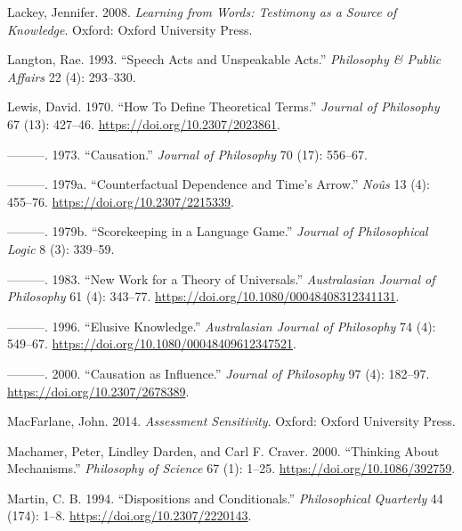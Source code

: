 \documentclass[
  12pt,
  letterpaper,
  DIV=11,
  numbers=noendperiod]{scrartcl}
\newlength{\cslhangindent}
\newenvironment{CSLReferences}[2] %
 {\begin{list}{}{%
  \setlength{\itemindent}{0pt}
  \setlength{\leftmargin}{0pt}
  \setlength{\parsep}{0pt}
  \ifodd #1
   \setlength{\leftmargin}{\cslhangindent}
   \setlength{\itemindent}{-1\cslhangindent}
  \fi
  \setlength{\itemsep}{#2\baselineskip}}}
 {\end{list}}
\begin{document}
\begin{CSLReferences}{1}{0}
Lackey, Jennifer. 2008. \emph{Learning from Words: Testimony as a Source
of Knowledge}. Oxford: Oxford University Press.

Langton, Rae. 1993. {``Speech Acts and Unspeakable Acts.''}
\emph{Philosophy \& Public Affairs} 22 (4): 293--330.

Lewis, David. 1970. {``How To Define Theoretical Terms.''} \emph{Journal
of Philosophy} 67 (13): 427--46. \url{https://doi.org/10.2307/2023861}.

---------. 1973. {``Causation.''} \emph{Journal of Philosophy} 70 (17):
556--67.

---------. 1979a. {``Counterfactual Dependence and Time's Arrow.''}
\emph{Noûs} 13 (4): 455--76. \url{https://doi.org/10.2307/2215339}.

---------. 1979b. {``Scorekeeping in a Language Game.''} \emph{Journal
of Philosophical Logic} 8 (3): 339--59.

---------. 1983. {``New Work for a Theory of Universals.''}
\emph{Australasian Journal of Philosophy} 61 (4): 343--77.
\url{https://doi.org/10.1080/00048408312341131}.

---------. 1996. {``Elusive Knowledge.''} \emph{Australasian Journal of
Philosophy} 74 (4): 549--67.
\url{https://doi.org/10.1080/00048409612347521}.

---------. 2000. {``Causation as Influence.''} \emph{Journal of
Philosophy} 97 (4): 182--97. \url{https://doi.org/10.2307/2678389}.

MacFarlane, John. 2014. \emph{Assessment Sensitivity}. Oxford: Oxford
University Press.

Machamer, Peter, Lindley Darden, and Carl F. Craver. 2000. {``Thinking
About Mechanisms.''} \emph{Philosophy of Science} 67 (1): 1--25.
\url{https://doi.org/10.1086/392759}.

Martin, C. B. 1994. {``Dispositions and Conditionals.''}
\emph{Philosophical Quarterly} 44 (174): 1--8.
\url{https://doi.org/10.2307/2220143}.


\end{CSLReferences}
\end{document}

